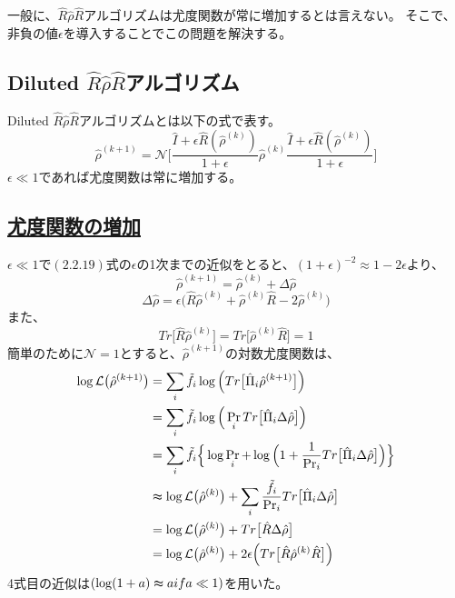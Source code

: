 \documentclass[11pt,a4j,notitlepage]{jreport}
\begin{document}
	一般に、$\hat{R} \hat{\rho} \hat{R}$アルゴリズムは尤度関数が常に増加するとは言えない。
	そこで、非負の値$\epsilon$を導入することでこの問題を解決する。

	\subsection{Diluted $\hat{R} \hat{\rho} \hat{R}$アルゴリズム}

	Diluted $\hat{R} \hat{\rho} \hat{R}$アルゴリズムとは以下の式で表す。
	\begin{equation}
		\hat{\rho}^{(k+1)} = \mathcal{N} \Bigg[ \frac{\hat{I} + \epsilon \hat{R} (\hat{\rho}^{(k)})}{1+\epsilon} \hat{\rho}^{(k)} \frac{\hat{I} + \epsilon \hat{R} (\hat{\rho}^{(k)})}{1+\epsilon} \Bigg]
	\end{equation}
	$\epsilon \ll 1$であれば尤度関数は常に増加する。

	\subsection*{\underline{尤度関数の増加}}

	$\epsilon \ll 1$で$(2.2.19)$式の$\epsilon$の1次までの近似をとると、$(1 + \epsilon)^{-2} \approx 1 - 2\epsilon$より、
	\begin{equation}
		\hat{\rho}^{(k+1)} = \hat{\rho}^{(k)} + \Delta \hat{\rho}
	\end{equation}
	\begin{equation}
		\Delta \hat{\rho} = \epsilon \big( \hat{R} \hat{\rho}^{(k)} + \hat{\rho}^{(k)} \hat{R} -2 \hat{\rho}^{(k)} \big)
	\end{equation}
	また、
	\begin{equation}
		Tr \big[ \hat{R} \hat{\rho}^{(k)} \big] = Tr \big[ \hat{\rho}^{(k)} \hat{R} \big] = 1 
	\end{equation}
	簡単のために$\mathcal{N} = 1$とすると、$\hat{\rho}^{(k+1)}$の対数尤度関数は、
	\begin{equation}
		\begin{aligned}
			\log \mathcal{L} \big( \hat{\rho}^{(k+1)} \big) &= \sum_i \tilde{f}_i \log \Big( Tr \big[ \hat{\Pi}_i \hat{\rho}^{(k+1)} \big] \Big) \\
			&= \sum_i \tilde{f}_i \log \Big( \Pr_i Tr \big[ \hat{\Pi}_i \Delta \hat{\rho} \big] \Big) \\
			&= \sum_i \tilde{f}_i \Big\{ \log \Pr_i + \log \Big( 1 + \frac{1}{\Pr_i} Tr \big[ \hat{\Pi}_i \Delta \hat{\rho} \big] \Big) \Big\} \\
			&\thickapprox \log \mathcal{L} \big( \hat{\rho}^{(k)} \big) + \sum_i \frac{\tilde{f}_i}{\Pr_i} Tr \big[ \hat{\Pi}_i \Delta \hat{\rho} \big] \\
			&= \log \mathcal{L} \big( \hat{\rho}^{(k)} \big) + Tr \big[ \hat{R} \Delta \hat{\rho} \big] \\
			&= \log \mathcal{L} \big( \hat{\rho}^{(k)} \big) + 2 \epsilon \Big( Tr \big[ \hat{R} \hat{\rho}^{(k)} \hat{R} \big] \Big)
		\end{aligned}
	\end{equation}
	4式目の近似は$( \log (1 + a) \thickapprox a if a \ll 1 )$を用いた。\\
\end{document}
